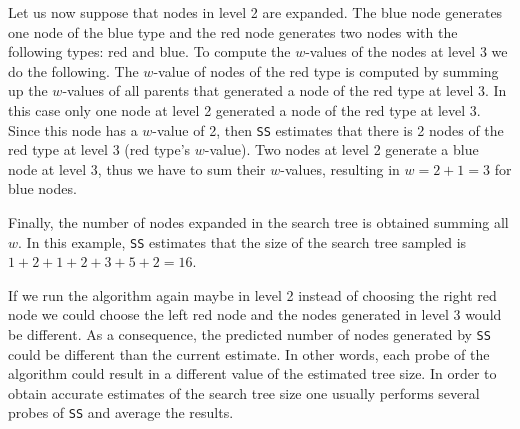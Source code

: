 Let us now suppose that nodes in level 2 are expanded. The blue node generates one node of the blue type and the red node generates two nodes with the following types: red and blue. To compute the $w$-values of the nodes at level 3 we do the following. The $w$-value of nodes of the red type is computed by summing up the $w$-values of all parents that generated a node of the red type at level 3. In this case only one node at level 2 generated a node of the red type at level 3. Since this node has a $w$-value of 2, then \texttt{SS} estimates that there is 2 nodes of the red type at level 3 (red type's $w$-value). Two nodes at level 2 generate a blue node at level 3, thus we have to sum their $w$-values, resulting in $w = 2 + 1 = 3$ for blue nodes.

Finally, the number of nodes expanded in the search tree is obtained summing all $w$. In this example, \texttt{SS} estimates that the size of the search tree sampled is $1 + 2 + 1 + 2 + 3 + 5 + 2 = 16$. 

If we run the algorithm again maybe in level 2 instead of choosing the right red node we could choose the left red node and the nodes generated in level 3 would be different. As a consequence, the predicted number of nodes generated by \texttt{SS} could be different than the current estimate. In other words, each probe of the algorithm could result in a different value of the estimated tree size. In order to obtain accurate estimates of the search tree size one usually performs several probes of \texttt{SS} and average the results.